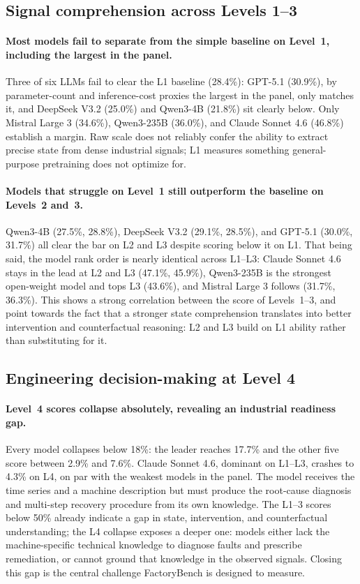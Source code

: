 \documentclass{article}
\begin{document}
\subsection{Signal comprehension across Levels 1--3}

\paragraph{Most models fail to separate from the simple baseline on Level~1, including the largest in the panel.}
Three of six LLMs fail to clear the L1 baseline (28.4\%): GPT-5.1 (30.9\%), by parameter-count and inference-cost proxies the largest in the panel, only matches it, and DeepSeek V3.2 (25.0\%) and Qwen3-4B (21.8\%) sit clearly below. Only Mistral Large 3 (34.6\%), Qwen3-235B (36.0\%), and Claude Sonnet 4.6 (46.8\%) establish a margin. Raw scale does not reliably confer the ability to extract precise state from dense industrial signals; L1 measures something general-purpose pretraining does not optimize for.

\paragraph{Models that struggle on Level~1 still outperform the baseline on Levels~2 and~3.}
Qwen3-4B (27.5\%, 28.8\%), DeepSeek V3.2 (29.1\%, 28.5\%), and GPT-5.1 (30.0\%, 31.7\%) all clear the bar on L2 and L3 despite scoring below it on L1. That being said, the model rank order is nearly identical across L1--L3: Claude Sonnet 4.6 stays in the lead at L2 and L3 (47.1\%, 45.9\%), Qwen3-235B is the strongest open-weight model and tops L3 (43.6\%), and Mistral Large 3 follows (31.7\%, 36.3\%). This shows a strong correlation between the score of Levels~1--3, and point towards the fact that a stronger state comprehension translates into better intervention and counterfactual reasoning: L2 and L3 build on L1 ability rather than substituting for it.

\subsection{Engineering decision-making at Level 4}

\paragraph{Level~4 scores collapse absolutely, revealing an industrial readiness gap.}
Every model collapses below 18\%: the leader reaches 17.7\% and the other five score between 2.9\% and 7.6\%. Claude Sonnet 4.6, dominant on L1--L3, crashes to 4.3\% on L4, on par with the weakest models in the panel. The model receives the time series and a machine description but must produce the root-cause diagnosis and multi-step recovery procedure from its own knowledge. The L1--3 scores below 50\% already indicate a gap in state, intervention, and counterfactual understanding; the L4 collapse exposes a deeper one: models either lack the machine-specific technical knowledge to diagnose faults and prescribe remediation, or cannot ground that knowledge in the observed signals. Closing this gap is the central challenge FactoryBench is designed to measure.
\end{document}
